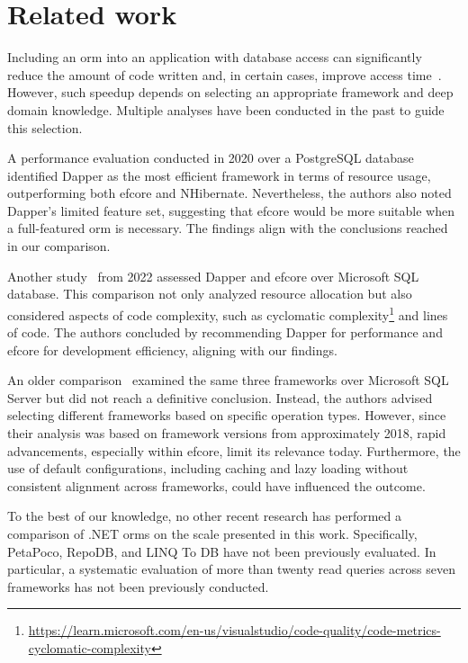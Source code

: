 \chapter{Related work}\label{chapter:related_work}
Including an \acrshort{orm} into an application with database access can significantly reduce the amount of code written and, in certain cases, improve access time~\cite{optimizatio_code_lines_time}. However, such speedup depends on selecting an appropriate framework and deep domain knowledge. Multiple analyses have been conducted in the past to guide this selection.

A performance evaluation conducted in 2020 over a PostgreSQL database~\cite{orm_comp_postgre} identified Dapper as the most efficient framework in terms of resource usage, outperforming both \acrshort{efcore} and NHibernate. Nevertheless, the authors also noted Dapper's limited feature set, suggesting that \acrshort{efcore} would be more suitable when a full-featured \acrshort{orm} is necessary. The findings align with the conclusions reached in our comparison.

Another study~\cite{myllyahoforsberg2022orm} from 2022 assessed Dapper and \acrfull{efcore} over Microsoft SQL database. This comparison not only analyzed resource allocation but also considered aspects of code complexity, such as cyclomatic complexity\footnote{\url{https://learn.microsoft.com/en-us/visualstudio/code-quality/code-metrics-cyclomatic-complexity}} and lines of code. The authors concluded by recommending Dapper for performance and \acrshort{efcore} for development efficiency, aligning with our findings.

An older comparison~\cite{orm_comp_2020} examined the same three frameworks over Microsoft SQL Server but did not reach a definitive conclusion. Instead, the authors advised selecting different frameworks based on specific operation types. However, since their analysis was based on framework versions from approximately 2018, rapid advancements, especially within \acrshort{efcore}, limit its relevance today. Furthermore, the use of default configurations, including caching and lazy loading without consistent alignment across frameworks, could have influenced the outcome.


To the best of our knowledge, no other recent research has performed a comparison of .NET \acrshort{orm}s on the scale presented in this work. Specifically, PetaPoco, RepoDB, and LINQ To DB have not been previously evaluated. In particular, a systematic evaluation of more than twenty read queries across seven frameworks has not been previously conducted.

